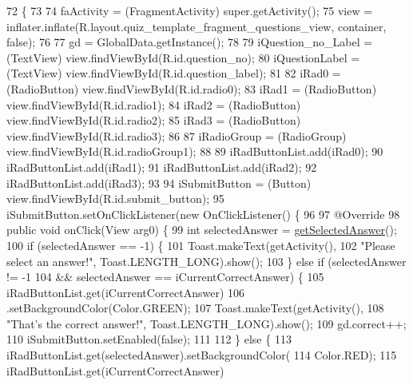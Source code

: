 \begin{DoxyCode}
72                                                                                                       \{
73 
74         faActivity = (FragmentActivity) super.getActivity();
75         view = inflater.inflate(R.layout.quiz\_template\_fragment\_questions\_view, container, \textcolor{keyword}{false});
76 
77         gd = GlobalData.getInstance();
78 
79         iQuestion\_no\_Label = (TextView) view.findViewById(R.id.question\_no);
80         iQuestionLabel = (TextView) view.findViewById(R.id.question\_label);
81 
82         iRad0 = (RadioButton) view.findViewById(R.id.radio0);
83         iRad1 = (RadioButton) view.findViewById(R.id.radio1);
84         iRad2 = (RadioButton) view.findViewById(R.id.radio2);
85         iRad3 = (RadioButton) view.findViewById(R.id.radio3);
86 
87         iRadioGroup = (RadioGroup) view.findViewById(R.id.radioGroup1);
88 
89         iRadButtonList.add(iRad0);
90         iRadButtonList.add(iRad1);
91         iRadButtonList.add(iRad2);
92         iRadButtonList.add(iRad3);
93 
94         iSubmitButton = (Button) view.findViewById(R.id.submit\_button);
95         iSubmitButton.setOnClickListener(\textcolor{keyword}{new} OnClickListener() \{
96 
97             @Override
98             \textcolor{keyword}{public} \textcolor{keywordtype}{void} onClick(View arg0) \{
99                 \textcolor{keywordtype}{int} selectedAnswer = \hyperlink{classorg_1_1buildmlearn_1_1toolkit_1_1quiztemplate_1_1QuestionFragment_a72d22e68fe4a0e7e57e978e4b4cdd618}{getSelectedAnswer}();
100                 \textcolor{keywordflow}{if} (selectedAnswer == -1) \{
101                     Toast.makeText(getActivity(),
102                             \textcolor{stringliteral}{"Please select an answer!"}, Toast.LENGTH\_LONG).show();
103                 \} \textcolor{keywordflow}{else} \textcolor{keywordflow}{if} (selectedAnswer != -1
104                         && selectedAnswer == iCurrentCorrectAnswer) \{
105                     iRadButtonList.get(iCurrentCorrectAnswer)
106                             .setBackgroundColor(Color.GREEN);
107                     Toast.makeText(getActivity(),
108                             \textcolor{stringliteral}{"That's the correct answer!"}, Toast.LENGTH\_LONG).show();
109                     gd.correct++;
110                     iSubmitButton.setEnabled(\textcolor{keyword}{false});
111 
112                 \} \textcolor{keywordflow}{else} \{
113                     iRadButtonList.get(selectedAnswer).setBackgroundColor(
114                             Color.RED);
115                     iRadButtonList.get(iCurrentCorrectAnswer)

\end{DoxyCode}
